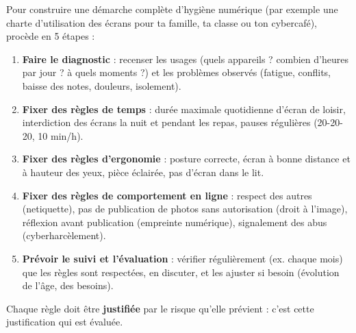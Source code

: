 \documentclass[11pt]{article}
\begin{document}
\begin{methode}
Pour construire une démarche complète d'hygiène numérique (par exemple une charte d'utilisation des écrans pour ta famille, ta classe ou ton cybercafé), procède en 5 étapes :
\begin{enumerate}
\item \textbf{Faire le diagnostic} : recenser les usages (quels appareils ? combien d'heures par jour ? à quels moments ?) et les problèmes observés (fatigue, conflits, baisse des notes, douleurs, isolement).
\item \textbf{Fixer des règles de temps} : durée maximale quotidienne d'écran de loisir, interdiction des écrans la nuit et pendant les repas, pauses régulières (20-20-20, 10 min/h).
\item \textbf{Fixer des règles d'ergonomie} : posture correcte, écran à bonne distance et à hauteur des yeux, pièce éclairée, pas d'écran dans le lit.
\item \textbf{Fixer des règles de comportement en ligne} : respect des autres (netiquette), pas de publication de photos sans autorisation (droit à l'image), réflexion avant publication (empreinte numérique), signalement des abus (cyberharcèlement).
\item \textbf{Prévoir le suivi et l'évaluation} : vérifier régulièrement (ex. chaque mois) que les règles sont respectées, en discuter, et les ajuster si besoin (évolution de l'âge, des besoins).
\end{enumerate}
Chaque règle doit être \textbf{justifiée} par le risque qu'elle prévient : c'est cette justification qui est évaluée.
\end{methode}
\end{document}
